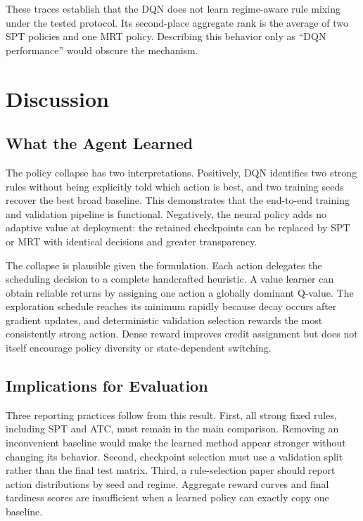 \documentclass[conference]{IEEEtran}
\newcommand{\method}[1]{\textsc{#1}}
\newcommand{\spt}{\method{SPT}}
\newcommand{\atc}{\method{ATC}}
\newcommand{\mrt}{\method{MRT}}
\begin{document}
These traces establish that the DQN does not learn regime-aware rule mixing under the tested protocol. Its second-place aggregate rank is the average of two \spt{} policies and one \mrt{} policy. Describing this behavior only as ``DQN performance'' would obscure the mechanism.

\section{Discussion}

\subsection{What the Agent Learned}

The policy collapse has two interpretations. Positively, DQN identifies two strong rules without being explicitly told which action is best, and two training seeds recover the best broad baseline. This demonstrates that the end-to-end training and validation pipeline is functional. Negatively, the neural policy adds no adaptive value at deployment: the retained checkpoints can be replaced by \spt{} or \mrt{} with identical decisions and greater transparency.

The collapse is plausible given the formulation. Each action delegates the scheduling decision to a complete handcrafted heuristic. A value learner can obtain reliable returns by assigning one action a globally dominant Q-value. The exploration schedule reaches its minimum rapidly because decay occurs after gradient updates, and deterministic validation selection rewards the most consistently strong action. Dense reward improves credit assignment but does not itself encourage policy diversity or state-dependent switching.

\subsection{Implications for Evaluation}

Three reporting practices follow from this result. First, all strong fixed rules, including \spt{} and \atc, must remain in the main comparison. Removing an inconvenient baseline would make the learned method appear stronger without changing its behavior. Second, checkpoint selection must use a validation split rather than the final test matrix. Third, a rule-selection paper should report action distributions by seed and regime. Aggregate reward curves and final tardiness scores are insufficient when a learned policy can exactly copy one baseline.
\end{document}
